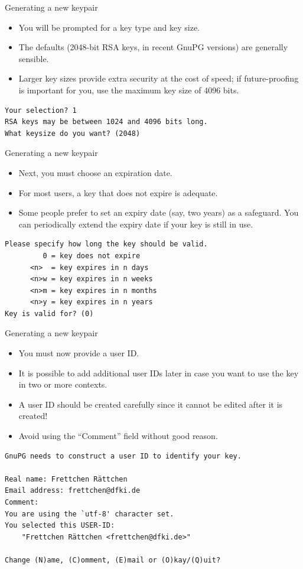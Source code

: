 \documentclass[%
mode=present,%
paper=smartboard,
size=20pt,
]{powerdot}
\newcommand\vsp{\vspace{-16mm}}
\begin{document}
\begin{slide}[method=direct,toc=]{Generating a new keypair}
  \begin{itemize}
  \item You will be prompted for a key type and key size.
  \item The defaults (2048-bit RSA keys, in recent GnuPG versions) are
    generally sensible.
  \item Larger key sizes provide extra security at the cost of speed;
    if future-proofing is important for you, use the maximum key size
    of 4096 bits.
  \end{itemize}
\begin{verbatim}
Your selection? 1
RSA keys may be between 1024 and 4096 bits long.
What keysize do you want? (2048)
\end{verbatim}
\end{slide}

\begin{slide}[method=direct,toc=]{Generating a new keypair}
  \begin{itemize}
  \item Next, you must choose an expiration date.
  \item For most users, a key that does not expire is adequate.
  \item Some people prefer to set an expiry date (say, two years) as a
    safeguard. You can periodically extend the expiry date if your key
    is still in use.
  \end{itemize}
\begin{verbatim}
Please specify how long the key should be valid.
         0 = key does not expire
      <n>  = key expires in n days
      <n>w = key expires in n weeks
      <n>m = key expires in n months
      <n>y = key expires in n years
Key is valid for? (0)
\end{verbatim}
\end{slide}

\begin{slide}[method=direct,toc=]{Generating a new keypair}
  \begin{itemize}
  \item You must now provide a user ID.
  \item It is possible to add additional user IDs later in case you
    want to use the key in two or more contexts.
  \item A user ID should be created carefully since it cannot be
    edited after it is created!
  \item Avoid using the ``Comment'' field without good reason.
  \end{itemize}
\vsp
\begin{verbatim}
GnuPG needs to construct a user ID to identify your key.

Real name: Frettchen Rättchen
Email address: frettchen@dfki.de
Comment: 
You are using the `utf-8' character set.
You selected this USER-ID:
    "Frettchen Rättchen <frettchen@dfki.de>"

Change (N)ame, (C)omment, (E)mail or (O)kay/(Q)uit?
\end{verbatim}
\end{slide}
\end{document}
